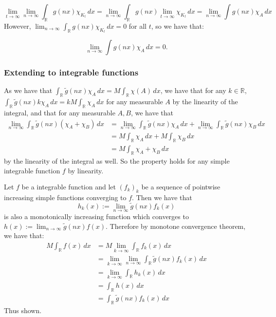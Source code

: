 \documentclass{article}
\theoremstyle{definition}
\numberwithin{theorem}{section}
\numberwithin{equation}{section}
\begin{document}
\begin{equation}
	\lim_{t \rightarrow \infty} \lim_{n \rightarrow \infty} \int_{\mathbb{R}} g(nx) \chi_{K_t} \, dx = \lim_{n \rightarrow \infty}  \int_{\mathbb{R}} g(nx) \lim_{t \rightarrow \infty}\chi_{K_t} \, dx = \lim_{n \rightarrow \infty} \int g(nx) \chi_{A} \, dx
\end{equation}
However, $\lim_{n \rightarrow \infty} \int_{\mathbb{R}} g(nx) \chi_{K_t} \, dx = 0$ for all $t$, so we have that:

\begin{equation}
	\lim_{n \rightarrow \infty} \int g(nx) \chi_{A} \, dx = 0.
\end{equation}

\subsubsection{Extending to integrable functions}
As we have that $\int_{\mathbb{R}} \tilde{g}(nx) \chi_A \, dx = M \int_{\mathbb{R}} \chi(A) \, dx$, we have that for any $k \in \mathbb{R}$, $\int_{\mathbb{R}}\tilde{g}(nx) k \chi_A \, dx = k M \int_{\mathbb{R}} \chi_A  \, dx $ for any measurable $A$ by the linearity of the integral, and that for any measurable $A, B$, we have that
\begin{align*}
	\lim_{n \rightarrow \infty} \int_{\mathbb{R}} \tilde{g}(nx) (\chi_A + \chi_B) \, dx &= \lim_{n \rightarrow \infty} \int_{\mathbb{R}} \tilde{g}(nx) \chi_A \, dx + \lim_{n \rightarrow \infty} \int_{\mathbb{R}} \tilde{g}(nx) \chi_B \, dx\\
	&= M \int_{\mathbb{R}} \chi_A \, dx + M \int_{\mathbb{R}} \chi_B \, dx\\
	&= M \int_{\mathbb{R}} \chi_A + \chi_B \, dx 
\end{align*}
 by the linearity of the integral as well. So the property holds for any simple integrable function $f$ by linearity.

Let $f$ be a integrable function and let $\left(  f_k \right)_k$ be a sequence of pointwise increasing simple functions converging to $f$. Then we have that
\begin{equation}
	h_k(x) := \lim_{n \rightarrow \infty} \tilde{g}(nx)f_k(x)
\end{equation}
is also a monotonically increasing function which converges to $h(x) := \lim_{n \rightarrow \infty} \tilde{g}(nx) f(x)$. Therefore by monotone convergence theorem, we have that:
\begin{align*}
	M \int_{\mathbb{R}} f(x) \, dx
	&= M \lim_{k \rightarrow \infty} \int_{\mathbb{R}} f_k(x) \, dx\\
	&= \lim_{k \rightarrow \infty} \lim_{n \rightarrow \infty} \int_{\mathbb{R}}  \tilde{g}(nx)f_k(x)\, dx\\
	&= \lim_{k \rightarrow \infty} \int_{\mathbb{R}}  h_k(x) \, dx\\
	&= \int_{\mathbb{R}} h(x) \, dx\\
	&= \int_{\mathbb{R}} \tilde{g}(nx)f_k(x) \, dx
\end{align*}
Thus shown.
\end{document}
